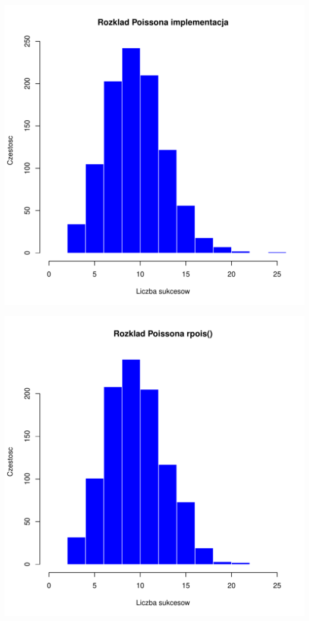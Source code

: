 \documentclass[12pt, a4paper]{article}\usepackage[]{graphicx}\usepackage[]{xcolor}
\makeatletter
\def\maxwidth{ %
  \ifdim\Gin@nat@width>\linewidth
    \linewidth
  \else
    \Gin@nat@width
  \fi
}
\newenvironment{knitrout}{}{} %
\makeatother
\begin{document}
\begin{itemize}
\begin{knitrout}
\color{fgcolor}

{\centering \includegraphics[width=\maxwidth]{figure/unnamed-chunk-10-1} 

}




{\centering \includegraphics[width=\maxwidth]{figure/unnamed-chunk-10-2} 

}


\end{knitrout}


\end{itemize}

\end{document}

